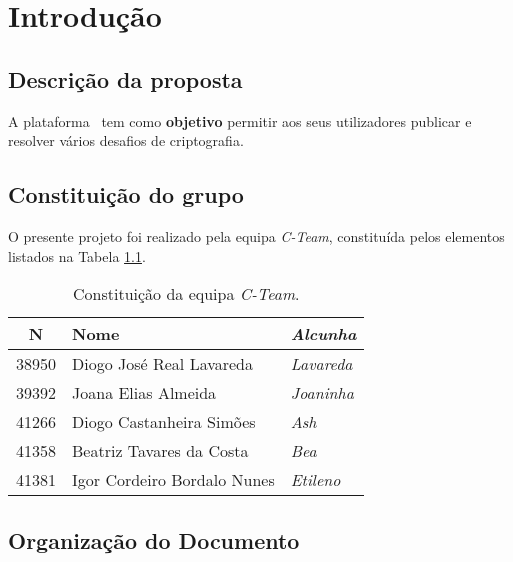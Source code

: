 \chapter{Introdução}
\label{chap:intro}

\section{Descrição da proposta}
\label{sec::intro:descricao}


A plataforma \appname~tem como \textbf{objetivo} permitir aos seus utilizadores publicar e resolver vários desafios de criptografia.



\section{Constituição do grupo}
\label{sec::intro:grupo}

O presente projeto foi realizado pela equipa \textit{C-Team}, constituída pelos elementos listados na Tabela \ref{tab::c-team}.

\begin{table}[!h]
	\centering
	\begin{tabular}{c l >{\itshape}l}
		\toprule
		\textbf{N\textordmasculine} & \textbf{Nome} & \normalfont\textbf{Alcunha} \\
		\midrule
		38950 & Diogo José Real Lavareda    & Lavareda \\
		39392 & Joana Elias Almeida         & Joaninha \\
		41266 & Diogo Castanheira Simões    & Ash      \\
		41358 & Beatriz Tavares da Costa    & Bea      \\
		41381 & Igor Cordeiro Bordalo Nunes & Etileno  \\
		\bottomrule
	\end{tabular}
	\caption[Constituição da equipa \textit{C-Team}]{Constituição da equipa \textit{C-Team}.}
	\label{tab::c-team}
\end{table}



\section{Organização do Documento}
\label{sec::intro:organizacao}

